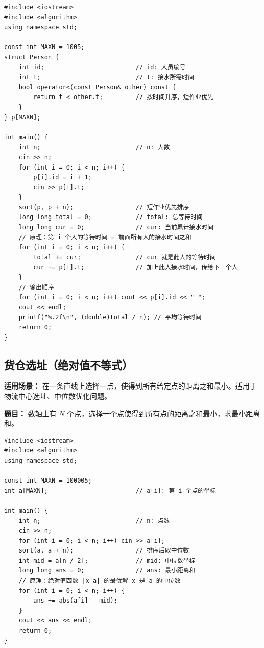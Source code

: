 \documentclass[12pt,a4paper]{ctexart}
\begin{document}
\begin{lstlisting}[caption={贪心——按服务时间升序排队，短作业优先}]
#include <iostream>
#include <algorithm>
using namespace std;

const int MAXN = 1005;
struct Person {
    int id;                         // id: 人员编号
    int t;                          // t: 接水所需时间
    bool operator<(const Person& other) const {
        return t < other.t;         // 按时间升序，短作业优先
    }
} p[MAXN];

int main() {
    int n;                          // n: 人数
    cin >> n;
    for (int i = 0; i < n; i++) {
        p[i].id = i + 1;
        cin >> p[i].t;
    }
    sort(p, p + n);                 // 短作业优先排序
    long long total = 0;            // total: 总等待时间
    long long cur = 0;              // cur: 当前累计接水时间
    // 原理：第 i 个人的等待时间 = 前面所有人的接水时间之和
    for (int i = 0; i < n; i++) {
        total += cur;               // cur 就是此人的等待时间
        cur += p[i].t;              // 加上此人接水时间，传给下一个人
    }
    // 输出顺序
    for (int i = 0; i < n; i++) cout << p[i].id << " ";
    cout << endl;
    printf("%.2f\n", (double)total / n); // 平均等待时间
    return 0;
}
\end{lstlisting}

\subsection{货仓选址（绝对值不等式）}
\textbf{适用场景：} 在一条直线上选择一点，使得到所有给定点的距离之和最小。适用于物流中心选址、中位数优化问题。

\textbf{题目：} 数轴上有 $N$ 个点，选择一个点使得到所有点的距离之和最小，求最小距离和。

\begin{lstlisting}[caption={贪心——选中位数，利用绝对值不等式}]
#include <iostream>
#include <algorithm>
using namespace std;

const int MAXN = 100005;
int a[MAXN];                        // a[i]: 第 i 个点的坐标

int main() {
    int n;                          // n: 点数
    cin >> n;
    for (int i = 0; i < n; i++) cin >> a[i];
    sort(a, a + n);                 // 排序后取中位数
    int mid = a[n / 2];             // mid: 中位数坐标
    long long ans = 0;              // ans: 最小距离和
    // 原理：绝对值函数 |x-a| 的最优解 x 是 a 的中位数
    for (int i = 0; i < n; i++) {
        ans += abs(a[i] - mid);
    }
    cout << ans << endl;
    return 0;
}
\end{lstlisting}
\end{document}
